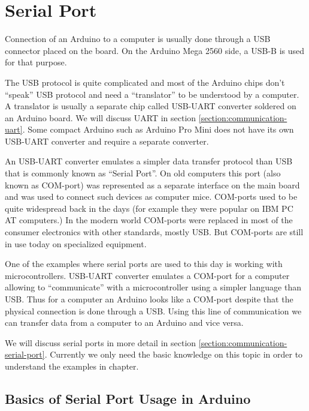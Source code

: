 \documentclass[../sparc.tex]{subfiles}
\begin{document}
\section{Serial Port}
\label{section:serial-port}

Connection of an Arduino to a computer is usually done through a USB connector
placed on the board.  On the Arduino Mega 2560 side, a USB-B is used for that
purpose.

The USB protocol is quite complicated and most of the Arduino chips don't
``speak'' USB protocol and need a ``translator'' to be understood by a computer.
A translator is usually a separate chip called USB-UART converter soldered on an
Arduino board.  We will discuss UART in section
\ref{section:communication-uart}.  Some compact Arduino such as Arduino Pro Mini
does not have its own USB-UART converter and require a separate converter.

An USB-UART converter emulates a simpler data transfer protocol than USB that is
commonly known as ``Serial Port''.  On old computers this port (also known as
COM-port) was represented as a separate interface on the main board and was used
to connect such devices as computer mice.  COM-ports used to be quite widespread
back in the days (for example they were popular on IBM PC AT computers.)  In the
modern world COM-ports were replaced in most of the consumer electronics with
other standards, mostly USB.  But COM-ports are still in use today on
specialized equipment.

One of the examples where serial ports are used to this day is working with
microcontrollers.  USB-UART converter emulates a COM-port for a computer
allowing to ``communicate'' with a microcontroller using a simpler language than
USB.  Thus for a computer an Arduino looks like a COM-port despite that the
physical connection is done through a USB.  Using this line of communication we
can transfer data from a computer to an Arduino and vice versa.

We will discuss serial ports in more detail in section
\ref{section:communication-serial-port}.  Currently we only need the basic
knowledge on this topic in order to understand the examples in chapter.

\subsection{Basics of Serial Port Usage in Arduino}
\end{document}
